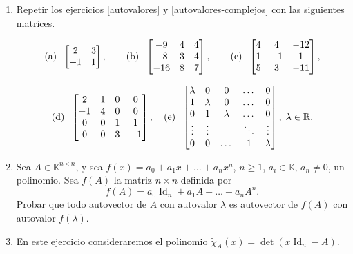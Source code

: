 \begin{enumerate}[resume,topsep=6pt,itemsep=.4cm]

\item\label{mas} Repetir los ejercicios \ref{autovalores} y \ref{autovalores-complejos} con las siguientes matrices.

$$\textrm{(a)\; }\begin{bmatrix} 2 & 3 \\ -1 & 1
\end{bmatrix}, \qquad
\textrm{(b)\; }\begin{bmatrix} -9 & 4 & 4 \\ -8 & 3 & 4 \\ -16 & 8 & 7 \end{bmatrix}, \qquad \textrm{(c)\; } \left[\begin{matrix}4 & 4 & -12\\ 1 & -1 & 1\\ 5 & 3 & -11 \end{matrix} \right],$$

$$
\textrm{(d)\; } \left[\begin{matrix}2 & 1 & 0 & 0\\ -1 & 4 & 0 & 0\\ 0 & 0 & 1 & 1 \\ 0 & 0 & 3 & -1\end{matrix} \right],
\quad \textrm{(e)\; } \begin{bmatrix} \lambda & 0 & 0 & \dots & 0  \\ 1 & \lambda & 0 &\dots & 0  \\ 0 & 1 & \lambda&  \dots & 0  \\ \vdots & \vdots & \quad & \ddots & \vdots\\ 0 &  0&   \dots & 1  & \lambda \end{bmatrix}, \; \lambda\in \mathbb R.
$$


\item Sea $A\in\mathbb{K}^{n\times n}$, y sea $f(x) = a_0 + a_1 x + \dots + a_nx^n$, $n \geq 1$, $a_i\in\mathbb{K}$, $a_n \neq 0$, un polinomio. Sea $f(A)$ la matriz $n \times n$ definida por
$$f(A) = a_0 \operatorname{Id}_n + a_1 A + \dots + a_n A^n.$$
Probar que todo autovector de $A$ con autovalor $\lambda$ es autovector de $f(A)$ con autovalor $f(\lambda)$.


\item\label{caracteristico-otro} {En este ejercicio consideraremos el polinomio $\tilde\chi_A(x)=\det(x\operatorname{Id}_n-A)$.}


\end{enumerate}

